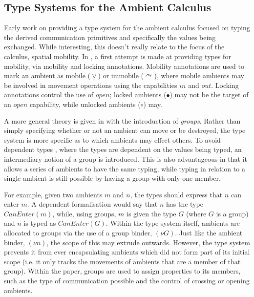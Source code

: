 
\subsection{Type Systems for the Ambient Calculus}
\label{ambienttypes}

Early work \cite{commtypesamb} on providing a type system for the
ambient calculus focused on typing the derived communication primitives
and specifically the values being exchanged.  While interesting, this
doesn't really relate to the focus of the calculus, spatial mobility.
In \cite{cardelli:typesforambients, cardelli:ambienttypes}, a first
attempt is made at providing types for mobility, via mobility and locking
annotations.  Mobility annotations are used to mark an ambient as mobile
($\underline{\vee}$) or immobile ($\curvearrowright$), where mobile
ambients may be involved in movement operations using the capabilities
$in$ and $out$.  Locking annotations control the use of $open$; locked
ambients ($\bullet$) may not be the target of an $open$ capability,
while unlocked ambients ($\circ$) may.

A more general theory is given in \cite{ambienttypes} with the
introduction of \emph{groups}.  Rather than simply specifying whether or
not an ambient can move or be destroyed, the type system is more
specific as to which ambients may effect others.  To avoid dependent
types \cite{deptypes}, where the types are dependent on the values being
typed, an intermediary notion of a group is introduced.  This is also
advantageous in that it allows a series of ambients to have the same
typing, while typing in relation to a single ambient is still possible
by having a group with only one member.

For example, given two ambients $m$ and $n$, the types should express
that $n$ can enter $m$.  A dependent formalisation would say that $n$
has the type $CanEnter(m)$, while, using groups, $m$ is given the type
$G$ (where $G$ is a group) and $n$ is typed as $CanEnter(G)$.  Within
the type system itself, ambients are allocated to groups via the use of
a group binder, $(\nu G)$.  Just like the ambient binder, $(\nu n)$,
the scope of this may extrude outwards.  However, the type system
prevents it from ever encapsulating ambients which did not form part of
its initial scope (i.e. it only tracks the movements of ambients that
are a member of that group).  Within the paper, groups are used to
assign properties to its members, such as the type of communication
possible and the control of crossing or opening ambients.

